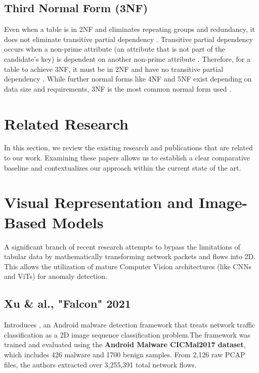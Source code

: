 \documentclass[12pt, a4paper]{report}
\begin{document}
\subsection*{Third Normal Form (3NF)}
Even when a table is in 2NF and eliminates repeating groups and redundancy, it does not eliminate transitive partial dependency . Transitive partial dependency occurs when a non-prime attribute (an attribute that is not part of the candidate's key) is dependent on another non-prime attribute . Therefore, for a table to achieve 3NF, it must be in 2NF and have no transitive partial dependency . While further normal forms like 4NF and 5NF exist depending on data size and requirements, 3NF is the most common normal form used .







\section{Related Research}

In this section, we review the existing research and publications that are  related to our work. Examining these papers allows us to establish a clear comparative baseline and contextualizes our approach within the current state of the art.

\section{Visual Representation and Image-Based Models}
A significant branch of recent research attempts to bypass the limitations of tabular data by mathematically transforming network packets and flows into 2D. This allows the utilization of mature Computer Vision architectures (like CNNs and ViTs) for anomaly detection.

\subsection{Xu \& al., "Falcon" 2021}
Introduces \cite{xu2021falcon}, an Android malware detection framework that treats network traffic classification as a 2D image sequence classification problem.The framework was trained and evaluated using the \textbf{Android Malware CICMal2017 dataset}, which includes 426 malware and 1700 benign samples. From 2,126 raw PCAP files, the authors extracted over 3,255,391 total network flows.
\end{document}
